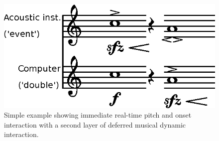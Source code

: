 \begin{figure}
\centering
\includegraphics[width=.75\linewidth]{img/lily-interaction}
  \caption[Simplified example of real-time pitch and onset interaction.]{Simple example showing immediate real-time pitch and onset interaction with a second layer of deferred musical dynamic interaction.}
\label{fig:interactive-1A}
\end{figure}
